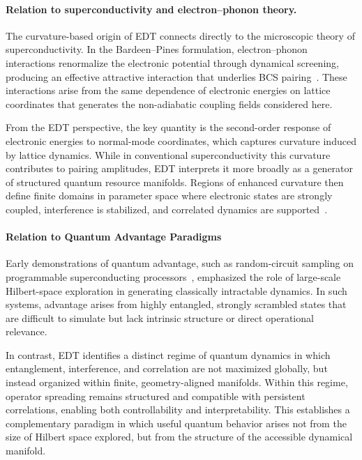 ﻿\documentclass[aps,prx,reprint,superscriptaddress,longbibliography,floatfix]{revtex4-2}
\begin{document}
\paragraph*{Relation to superconductivity and electron--phonon theory.}

The curvature-based origin of EDT connects directly to the microscopic theory of superconductivity. In the Bardeen--Pines formulation, electron--phonon interactions renormalize the electronic potential through dynamical screening, producing an effective attractive interaction that underlies BCS pairing~\cite{BardeenPines1955,BCS1957}. These interactions arise from the same dependence of electronic energies on lattice coordinates that generates the non-adiabatic coupling fields considered here.

From the EDT perspective, the key quantity is the second-order response of electronic energies to normal-mode coordinates, which captures curvature induced by lattice dynamics. While in conventional superconductivity this curvature contributes to pairing amplitudes, EDT interprets it more broadly as a generator of structured quantum resource manifolds. Regions of enhanced curvature then define finite domains in parameter space where electronic states are strongly coupled, interference is stabilized, and correlated dynamics are supported~\cite{Giustino2017}.

\paragraph*{Relation to Quantum Advantage Paradigms}

Early demonstrations of quantum advantage, such as random-circuit sampling on programmable superconducting processors~\cite{Arute2019}, emphasized the role of large-scale Hilbert-space exploration in generating classically intractable dynamics. In such systems, advantage arises from highly entangled, strongly scrambled states that are difficult to simulate but lack intrinsic structure or direct operational relevance.

In contrast, EDT identifies a distinct regime of quantum dynamics in which entanglement, interference, and correlation are not maximized globally, but instead organized within finite, geometry-aligned manifolds. Within this regime, operator spreading remains structured and compatible with persistent correlations, enabling both controllability and interpretability. This establishes a complementary paradigm in which useful quantum behavior arises not from the size of Hilbert space explored, but from the structure of the accessible dynamical manifold.
\end{document}
